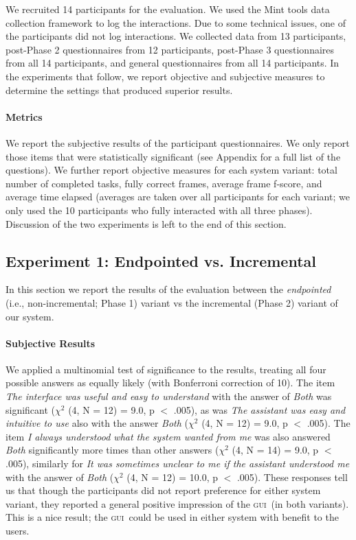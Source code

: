 \documentclass[11pt]{article}
\newcommand{\ui}[0]{\textsc{gui}}
\begin{document}
We recruited 14 participants for the evaluation. We used the Mint tools data collection framework \cite{kousidis2012evaluating} to log the interactions. Due to some technical issues, one of the participants did not log interactions. We collected data from 13 participants, post-Phase 2 questionnaires from 12 participants,  post-Phase 3 questionnaires from all 14 participants, and general questionnaires from all 14 participants. In the experiments that follow, we report objective and subjective measures to determine the settings that produced superior results.

\paragraph{Metrics} We report the subjective results of the participant questionnaires. We only report those items that were statistically significant (see Appendix for a full list of the questions). We further report objective measures for each system variant: total number of completed tasks, fully correct frames, average frame f-score, and average time elapsed (averages are taken over all participants for each variant; we only used the 10 participants who fully interacted with all three phases). Discussion of the two experiments is left to the end of this section.

\subsection{Experiment 1: Endpointed vs. Incremental}
\label{section:exp1}

In this section we report the results of the evaluation between the \emph{endpointed} (i.e., non-incremental; Phase 1) variant vs the incremental (Phase 2) variant of our system.

\paragraph{Subjective Results} We applied a multinomial test of significance to the results, treating all four possible answers as equally likely (with Bonferroni correction of 10). The item \emph{The interface was useful and easy to understand} with the answer of \emph{Both} was significant ($ \chi^2 $ (4, N = 12) = 9.0, p $<$ .005), as was \emph{The assistant was easy and intuitive to use} also with the answer \emph{Both} ($ \chi^2 $ (4, N = 12) = 9.0, p $<$ .005). The item \emph{I always understood what the system wanted from me} was also answered \emph{Both} significantly more times than other answers ($ \chi^2 $ (4, N = 14) = 9.0, p $<$ .005), similarly for \emph{It was sometimes unclear to me if the assistant understood me} with the answer of \emph{Both} ($ \chi^2 $ (4, N = 12) = 10.0, p $<$ .005).  These responses tell us that though the participants did not report preference for either system variant, they reported a general positive impression of the \ui\ (in both variants). This is a nice result; the \ui\ could be used in either system with benefit to the users.
\end{document}

